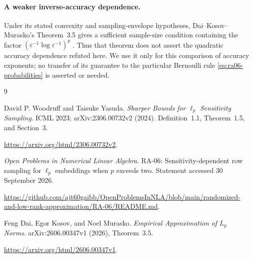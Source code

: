 \documentclass[11pt]{article}
\theoremstyle{spaced}
\numberwithin{equation}{section}
\begin{document}
\paragraph{A weaker inverse-accuracy dependence.}
Under its stated convexity and sampling-envelope hypotheses,
Dai--Kosov--Murasko's Theorem~3.5 gives a sufficient sample-size
condition containing the factor
$(\varepsilon^{-1}\log\varepsilon^{-1})^p$ \cite{dkm}.
Thus that theorem does not assert the quadratic accuracy dependence
refuted here. We use it only for this comparison of accuracy exponents;
no transfer of its guarantee to the particular Bernoulli rule
\eqref{eq:ra06-probabilities} is asserted or needed.

\begin{thebibliography}{9}

David P. Woodruff and Taisuke Yasuda.
\emph{Sharper Bounds for $\ell_p$ Sensitivity Sampling}.
ICML 2023; arXiv:2306.00732v2 (2024).
Definition~1.1, Theorem~1.5, and Section~3.
\par
\url{https://arxiv.org/html/2306.00732v2}.

\emph{Open Problems in Numerical Linear Algebra}.
RA-06: Sensitivity-dependent row sampling for $\ell_p$ embeddings
when $p$ exceeds two.
Statement accessed 30 September 2026.
\par
\url{https://github.com/ajt60gaibb/OpenProblemsInNLA/blob/main/randomized-and-low-rank-approximation/RA-06/README.md}.

Feng Dai, Egor Kosov, and Noel Murasko.
\emph{Empirical Approximation of $L_p$ Norms}.
arXiv:2606.00347v1 (2026), Theorem~3.5.
\par
\url{https://arxiv.org/html/2606.00347v1}.

\end{thebibliography}
\end{document}
